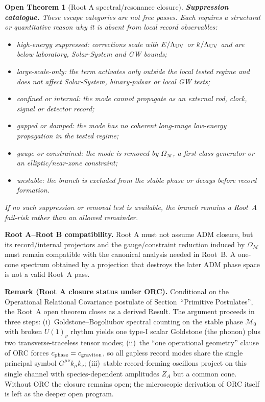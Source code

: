 \documentclass[11pt]{article}
\newtheorem{openthm}{Open Theorem}
\begin{document}
\begin{openthm}[Root A spectral/resonance closure]
\medskip\noindent\textbf{Suppression catalogue.}
These escape categories are not free passes.  Each requires a structural or
quantitative reason why it is absent from local record observables:
\begin{itemize}
\item high-energy suppressed: corrections scale with \(E/\Lambda_{\rm UV}\) or
  \(k/\Lambda_{\rm UV}\) and are below laboratory, Solar-System and GW bounds;
\item large-scale-only: the term activates only outside the local tested
  regime and does not affect Solar-System, binary-pulsar or local GW tests;
\item confined or internal: the mode cannot propagate as an external rod,
  clock, signal or detector record;
\item gapped or damped: the mode has no coherent long-range low-energy
  propagation in the tested regime;
\item gauge or constrained: the mode is removed by \(\Omega_{\mathcal M}\),
  a first-class generator or an elliptic/near-zone constraint;
\item unstable: the branch is excluded from the stable phase or decays before
  record formation.
\end{itemize}
If no such suppression or removal test is available, the branch remains a
Root~A fail-risk rather than an allowed remainder.
\end{openthm}

\medskip\noindent\textbf{Root A--Root B compatibility.}
Root A must not assume ADM closure, but its record/internal projectors and the
gauge/constraint reduction induced by \(\Omega_{\mathcal M}\) must remain
compatible with the canonical analysis needed in Root~B.  A one-cone spectrum
obtained by a projection that destroys the later ADM phase space is not a
valid Root~A pass.

\medskip\noindent\textbf{Remark (Root A closure status under ORC).}
Conditional on the Operational Relational Covariance postulate of
Section~``Primitive Postulates'', the Root~A open theorem closes as a
derived Result.  The argument proceeds in three steps:
(i)~Goldstone--Bogoliubov spectral counting on the stable phase
$\mathcal M_0$ with broken $U(1)_\nu$ rhythm yields one type-I scalar
Goldstone (the phonon) plus two transverse-traceless tensor modes;
(ii)~the ``one operational geometry'' clause of ORC forces
$c_{\rm phase}=c_{\rm graviton}$, so all gapless record modes share the
single principal symbol $G^{\mu\nu}k_\mu k_\nu$;
(iii)~stable record-forming oscillons project on this single channel with
species-dependent amplitudes $Z_A$ but a common cone.  Without ORC the
closure remains open; the microscopic derivation of ORC itself is left as
the deeper open program.
\end{document}
